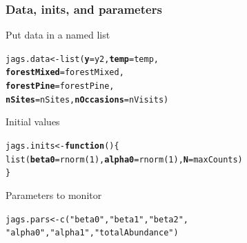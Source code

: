 \documentclass[color=usenames,dvipsnames]{beamer}\usepackage[]{graphicx}\usepackage[]{xcolor}
\makeatletter
\newcommand{\hlnum}[1]{\textcolor[rgb]{0.69,0.494,0}{#1}}%
\newcommand{\hlsng}[1]{\textcolor[rgb]{0.749,0.012,0.012}{#1}}%
\newcommand{\hldef}[1]{\textcolor[rgb]{0,0,0}{#1}}%
\newcommand{\hlkwa}[1]{\textcolor[rgb]{0,0,0}{\textbf{#1}}}%
\newcommand{\hlkwb}[1]{\textcolor[rgb]{0,0.341,0.682}{#1}}%
\newcommand{\hlkwc}[1]{\textcolor[rgb]{0,0,0}{\textbf{#1}}}%
\newcommand{\hlkwd}[1]{\textcolor[rgb]{0.004,0.004,0.506}{#1}}%
\newenvironment{kframe}{%
 \def\at@end@of@kframe{}%
 \ifinner\ifhmode%
  \def\at@end@of@kframe{\end{minipage}}%
  \begin{minipage}{\columnwidth}%
 \fi\fi%
 \def\FrameCommand##1{\hskip\@totalleftmargin \hskip-\fboxsep
 \colorbox{shadecolor}{##1}\hskip-\fboxsep
     \hskip-\linewidth \hskip-\@totalleftmargin \hskip\columnwidth}%
 \MakeFramed {\advance\hsize-\width
   \@totalleftmargin\z@ \linewidth\hsize
   \@setminipage}}%
 {\par\unskip\endMakeFramed%
 \at@end@of@kframe}
\newenvironment{knitrout}{}{} %
\makeatother
\begin{document}
\begin{frame}[fragile]
  \frametitle{Data, inits, and parameters}
  Put data in a named list
  \vspace{-12pt}
\begin{knitrout}\small
{}\color{fgcolor}\begin{kframe}
\begin{alltt}
\hldef{jags.data} \hlkwb{<-} \hlkwd{list}\hldef{(}\hlkwc{y}\hldef{=y2,} \hlkwc{temp}\hldef{=temp,}
                  \hlkwc{forestMixed}\hldef{=forestMixed,}
                  \hlkwc{forestPine}\hldef{=forestPine,}
                  \hlkwc{nSites}\hldef{=nSites,} \hlkwc{nOccasions}\hldef{=nVisits)}
\end{alltt}
\end{kframe}
\end{knitrout}
\pause
\vfill
  Initial values
  \vspace{-12pt}
\begin{knitrout}\small
{}\color{fgcolor}\begin{kframe}
\begin{alltt}
\hldef{jags.inits} \hlkwb{<-} \hlkwa{function}\hldef{() \{}
    \hlkwd{list}\hldef{(}\hlkwc{beta0}\hldef{=}\hlkwd{rnorm}\hldef{(}\hlnum{1}\hldef{),} \hlkwc{alpha0}\hldef{=}\hlkwd{rnorm}\hldef{(}\hlnum{1}\hldef{),} \hlkwc{N}\hldef{=maxCounts)}
\hldef{\}}
\end{alltt}
\end{kframe}
\end{knitrout}
\pause
\vfill
  Parameters to monitor
  \vspace{-12pt}
\begin{knitrout}\small
{}\color{fgcolor}\begin{kframe}
\begin{alltt}
\hldef{jags.pars} \hlkwb{<-} \hlkwd{c}\hldef{(}\hlsng{"beta0"}\hldef{,} \hlsng{"beta1"}\hldef{,} \hlsng{"beta2"}\hldef{,}
               \hlsng{"alpha0"}\hldef{,} \hlsng{"alpha1"}\hldef{,} \hlsng{"totalAbundance"}\hldef{)}
\end{alltt}
\end{kframe}
\end{knitrout}
\end{frame}
\end{document}
